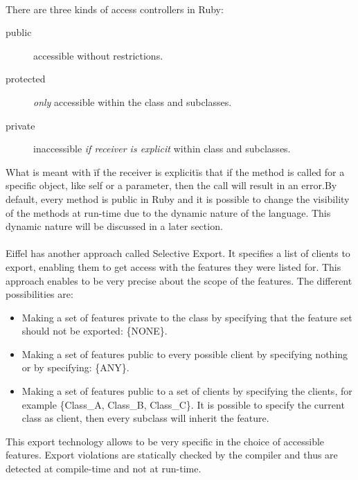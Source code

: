 \documentclass[12pt,a4paper,twocolumn]{article}
\begin{document}
\\
There are three kinds of access controllers in Ruby: 
\begin{description}
\item[public] accessible without restrictions.
\item[protected] \textit{only} accessible within the class and subclasses.
\item[private] inaccessible \textit{if receiver is explicit} within class and subclasses.
\end{description}
What is meant with \"if the receiver is explicit\"  is that if the method is called for a specific object, like self or a parameter, then the call will result in an error.By default, every method is public in Ruby and it is possible to change the visibility of the methods at run-time due to the dynamic nature of the language. This dynamic nature will be discussed in a later section.
\\
\\
Eiffel has another approach called Selective Export. It specifies a list of clients to export, enabling them to get access with the features they were listed for. This approach enables to be very precise about the scope of the features. The different possibilities are:
\begin{itemize}
\item Making a set of features private to the class by specifying that the feature set should not be exported: \{NONE\}.
\item Making a set of features public to every possible client by specifying nothing or by specifying: \{ANY\}.
\item Making a set of features public to a set of clients by specifying the clients, for example \{Class\_A, Class\_B, Class\_C\}. It is possible to specify the current class as client, then every subclass will inherit the feature.
\end{itemize}
This export technology allows to be very specific in the choice of accessible features. Export violations are statically checked by the compiler and thus are detected at compile-time and not at run-time.
\end{document}
